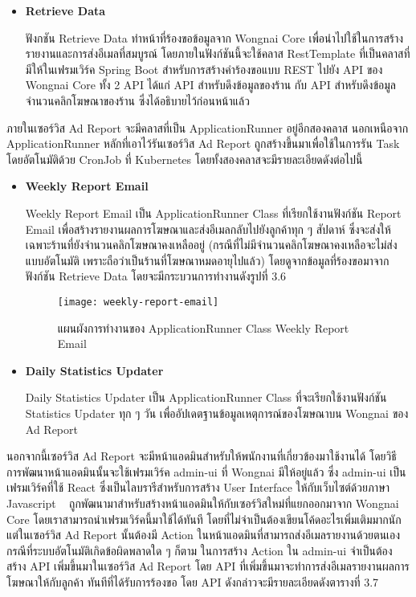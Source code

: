 \begin{enumerate}
\begin{itemize}
		\item \textbf{Retrieve Data}
		
		ฟังกชัน Retrieve Data ทำหน้าที่ร้องขอข้อมูลจาก Wongnai Core เพื่อนำไปใช้ในการสร้างรายงานและการส่งอีเมลที่สมบูรณ์ โดยภายในฟังก์ชันนี้จะใช้คลาส RestTemplate ที่เป็นคลาสที่มีให้ในเฟรมเวิร์ค Spring Boot สำหรับการสร้างคำร้องขอแบบ REST ไปยัง API ของ Wongnai Core ทั้ง 2 API ได้แก่ API สำหรับดึงข้อมูลของร้าน กับ API สำหรับดึงข้อมูลจำนวนคลิกโฆษณาของร้าน ซึ่งได้อธิบายไว้ก่อนหน้าแล้ว
	\end{itemize}

	ภายในเซอร์วิส Ad Report จะมีคลาสที่เป็น ApplicationRunner อยู่อีกสองคลาส นอกเหนือจาก ApplicationRunner หลักที่เอาไว้รันเซอร์วิส Ad Report ถูกสร้างขึ้นมาเพื่อใช้ในการรัน Task โดยอัตโนมัติด้วย CronJob ที่ Kubernetes โดยทั้งสองคลาสจะมีรายละเอียดดังต่อไปนี้

	\begin{itemize}
		\item \textbf{Weekly Report Email}
		
		Weekly Report Email  เป็น ApplicationRunner Class ที่เรียกใช้งานฟังก์ชัน Report Email เพื่อสร้างรายงานผลการโฆษณาและส่งอีเมลกลับไปยังลูกค้าทุก ๆ สัปดาห์ ซึ่งจะส่งให้เฉพาะร้านที่ยังจำนวนคลิกโฆษณาคงเหลืออยู่ (กรณีที่ไม่มีจำนวนคลิกโฆษณาคงเหลือจะไม่ส่งแบบอัตโนมัติ เพราะถือว่าเป็นร้านที่โฆษณาหมดอายุไปแล้ว) โดยดูจากข้อมูลที่ร้องขอมาจากฟังก์ชัน Retrieve Data โดยจะมีกระบวนการทำงานดังรูปที่ 3.6
	
		\begin{figure}[!h]
			\centering
			\texttt{[image: weekly-report-email]}  
			\caption{แผนผังการทำงานของ ApplicationRunner Class Weekly Report Email}
			\label{Fig:weekly-report-diagram}
		\end{figure}
	
		\item \textbf{Daily Statistics Updater}
	
		Daily Statistics Updater เป็น ApplicationRunner Class ที่จะเรียกใช้งานฟังก์ชัน Statistics Updater ทุก ๆ วัน เพื่ออัปเดตฐานข้อมูลเหตุการณ์ของโฆษณาบน Wongnai ของ Ad Report
	\end{itemize}

	นอกจากนี้เซอร์วิส Ad Report จะมีหน้าแอดมินสำหรับให้พนักงานที่เกี่ยวข้องมาใช้งานได้ โดยวิธีการพัฒนาหน้าแอดมินนั้นจะใช้เฟรมเวิร์ค admin-ui ที่ Wongnai มีให้อยู่แล้ว ซึ่ง admin-ui เป็นเฟรมเวิร์คที่ใช้ React ซึ่งเป็นไลบรารีสำหรับการสร้าง User Interface ให้กับเว็บไซต์ด้วยภาษา Javascript ~\cite{react} ถูกพัฒนามาสำหรับสร้างหน้าแอดมินให้กับเซอร์วิสใหม่ที่แยกออกมาจาก Wongnai Core โดยเราสามารถนำเฟรมเวิร์คนี้มาใช้ได้ทันที โดยที่ไม่จำเป็นต้องเขียนโค้ดอะไรเพิ่มเติมมากนัก แต่ในเซอร์วิส Ad Report นั้นต้องมี Action ในหน้าแอดมินที่สามารถส่งอีเมลรายงานด้วยตนเอง กรณีที่ระบบอัตโนมัติเกิดข้อผิดพลาดใด ๆ ก็ตาม ในการสร้าง Action ใน admin-ui จำเป็นต้องสร้าง API เพิ่มขึ้นมาในเซอร์วิส Ad Report โดย API ที่เพิ่มขึ้นมาจะทำการส่งอีเมลรายงานผลการโฆษณาให้กับลูกค้า ทันทีที่ได้รับการร้องขอ โดย API ดังกล่าวจะมีรายละเอียดดังตารางที่ 3.7
	

\end{enumerate}
